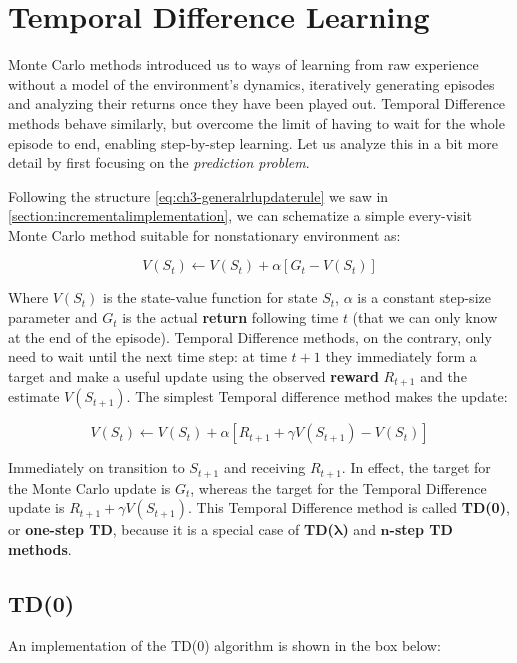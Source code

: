 \chapter{Temporal Difference Learning}
Monte Carlo methods introduced us to ways of learning from raw experience without a model of the environment’s dynamics, iteratively generating episodes and analyzing their returns once they have been played out. Temporal Difference methods behave similarly, but overcome the limit of having to wait for the whole episode to end, enabling step-by-step learning. Let us analyze this in a bit more detail by first focusing on the \textit{prediction problem}.

Following the structure \eqref{eq:ch3-generalrlupdaterule} we saw in \autoref{section:incrementalimplementation}, we can schematize a simple every-visit Monte Carlo method suitable for nonstationary environment as:

\begin{equation*}
    V(S_t) \leftarrow V(S_t) + \alpha \left[ G_t - V(S_t) \right]
\end{equation*}

Where $V(S_t)$ is the state-value function for state $S_t$, $\alpha$ is a constant step-size parameter and $G_t$ is the actual \textbf{return} following time $t$ (that we can only know at the end of the episode). Temporal Difference methods, on the contrary, only need to wait until the next time step: at time $t+1$ they immediately form a target and make a useful update using the observed \textbf{reward} $R_{t+1}$ and the estimate $V(S_{t+1})$. The simplest Temporal difference method makes the update:

\begin{equation}
    V(S_t) \leftarrow V(S_t) + \alpha \left[ R_{t+1} + \gamma V(S_{t+1}) - V(S_t) \right]
    \label{eq:ch5-genericonpolicytdupdate}
\end{equation}

Immediately on transition to $S_{t+1}$ and receiving $R_{t+1}$. In effect, the target for the Monte Carlo update is $G_t$, whereas the target for the Temporal Difference update is $R_{t+1} + \gamma V(S_{t+1})$. This Temporal Difference method is called \textbf{TD(0)}, or \textbf{one-step TD}, because it is a special case of \textbf{TD(}$\boldsymbol{\lambda}$\textbf{)} and $\boldsymbol{n}$\textbf{-step TD methods}.

\section{TD(0)}
An implementation of the TD(0) algorithm is shown in the box below:

